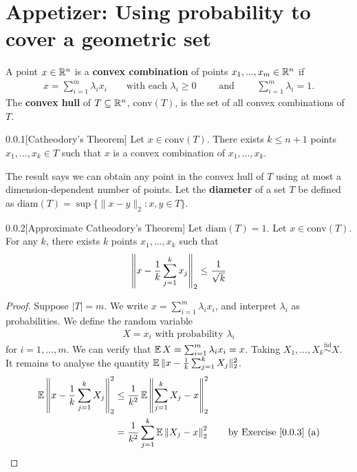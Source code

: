 

\section{Appetizer: Using probability to cover a geometric set}

A point $x \in \mathbb{R}^n$ is a \textbf{convex combination} of points $x_1,..., x_m \in \mathbb{R}^n$ if 
\begin{align*}
x = \sum_{i=1}^m \lambda_i x_i \qquad\text{with each } \lambda_i\geq0 \qquad\text{ and }\qquad \sum_{i=1}^m \lambda_i = 1.
\end{align*}
The \textbf{convex hull} of $T \subseteq \mathbb{R}^n$, $\text{conv}(T)$, is the set of all convex combinations of $T$.

\begin{thm}{0.0.1}[Catheodory's Theorem]\label{0.0.1}
Let $x \in \text{conv}(T)$. There exists $k \leq n+1$ points $x_1,...,x_k \in T$ such that $x$ is a convex combination of $x_1,...,x_k$.
\end{thm} 

The result says we can obtain any point in the convex hull of $T$ using at most a dimension-dependent number of points. Let the {\bf diameter} of a set $T$ be defined as $\text{diam}(T) = \sup \{\|x-y\|_2 : x,y \in T\}$.

\begin{thm}{0.0.2}[Approximate Catheodory's Theorem]\label{0.0.2}
Let $\text{diam}(T) = 1$. Let $x \in \text{conv}(T)$. For any $k$, there exists $k$ points $x_1,...,x_k$ such that
\begin{align*}
    \left\| x - \frac 1 k \sum_{j=1}^k x_j\right\|_2 \leq \frac 1 {\sqrt k}
\end{align*}
\end{thm}

\begin{proof}
Suppose $|T| = m$. We write $x = \sum_{i=1}^m\lambda_i x_i$, and interpret $\lambda_i$ as probabilities. We define the random variable
\begin{align*}
    X = x_i \text{ with probability } \lambda_i
\end{align*}
for $i=1,...,m$. We can verify that $\operatorname{\mathbb{E}} X = \sum_{i=1}^m \lambda_i x_i = x$. Taking $X_1,...,X_k \overset{\text{iid}}{\sim} X$. It remains to analyse the quantity $\operatorname{\mathbb{E}} \|x - \frac 1 k \sum_{j=1}^k X_j\|_2^2$.
\begin{align*}
    \operatorname{\mathbb{E}} \left\| x - \frac 1 k \sum_{j=1}^k X_j\right\|_2^2 &\leq \frac{1}{k^2}\operatorname{\mathbb{E}} \left\|\sum_{j=1}^k X_j -x\right\|_2^2 \\
    &= \frac{1}{k^2} \sum_{j=1}^k \operatorname{\mathbb{E}} \left\| X_j - x \right\|_2^2  \qquad\text{by Exercise \ref{0.0.3} (a)}\\
\end{align*}

\end{proof}

